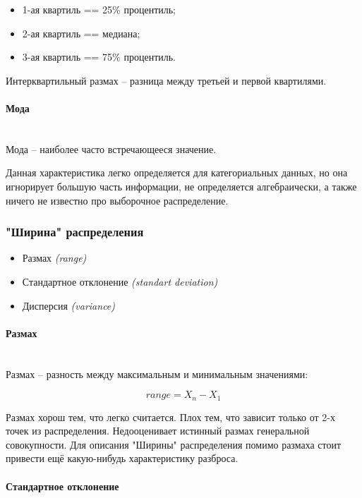 \begin{itemize}
	\item 1-ая квартиль == 25\% процентиль;
	\item 2-ая квартиль == медиана;
	\item 3-ая квартиль == 75\% процентиль.
\end{itemize}

Интерквартильный размах -- разница между третьей и первой квартилями.

\paragraph*{Мода} \mbox{} \\

Мода -- наиболее часто встречающееся значение.

Данная характеристика легко определяется для категориальных данных, но она игнорирует большую часть информации, не определяется алгебраически, а также ничего не известно про выборочное распределение.

\subsubsection*{"Ширина" \hspace{0.1cm} распределения}

\begin{itemize}
	\item Размах \textit{(range)}
	\item Стандартное отклонение \textit{(standart deviation)}
	\item Дисперсия \textit{(variance)}
\end{itemize}

\paragraph*{Размах} \mbox{} \\

Размах -- разность между максимальным и минимальным значениями:

\begin{equation}
	range = X_n - X_1
\end{equation}

Размах хорош тем, что легко считается. Плох тем, что зависит только от 2-х точек из распределения. Недооценивает истинный размах генеральной совокупности. Для описания "Ширины" распределения помимо размаха стоит привести ещё какую-нибудь характеристику разброса.

\paragraph*{Стандартное отклонение} \mbox{} \\

